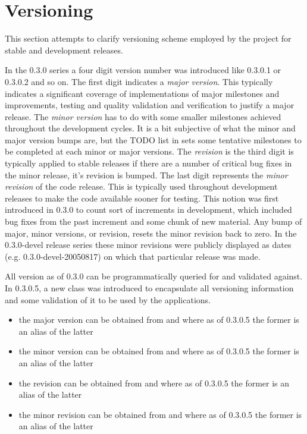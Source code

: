 \section{Versioning}

This section attempts to clarify versioning scheme employed
by the {\marf} project for stable and development releases.

In the 0.3.0 series a four digit version number was introduced
like 0.3.0.1 or 0.3.0.2 and so on. The first digit indicates
a {\em major version}. This typically indicates a significant
coverage of implementations of major milestones and improvements,
testing and quality validation and verification to justify a major
release. The {\em minor version} has to do with some smaller
milestones achieved throughout the development cycles.
It is a bit subjective of what the minor and major version bumps are, but
the TODO list in  sets some tentative milestones
to be completed at each minor or major versions. The {\em revision}
is the third digit is typically applied to stable releases if there
are a number of critical bug fixes in the minor release, it's revision
is bumped. The last digit represents the {\em minor revision} of the
code release. This is typically used throughout development releases
to make the code available sooner for testing. This notion was first
introduced in 0.3.0 to count sort of increments in {\marf} development,
which included bug fixes from the past increment and some chunk of new
material. Any bump of major, minor versions, or revision, resets the
minor revision back to zero. In the 0.3.0-devel release series these
minor revisions were publicly displayed as dates (e.g. 0.3.0-devel-20050817)
on which that particular release was made.

All version as of 0.3.0 can be programmatically queried for
and validated against. In 0.3.0.5, a new  class
was introduced to encapsulate all versioning information and
some validation of it to be used by the applications.

\begin{itemize}
\item
	the major version can be obtained from 
	and  where as of 0.3.0.5 the former
	is an alias of the latter

\item
	the minor version can be obtained from 
	and  where as of 0.3.0.5 the former
	is an alias of the latter

\item
	the revision can be obtained from 
	and  where as of 0.3.0.5 the former
	is an alias of the latter

\item
	the minor revision can be obtained from 
	and  where as of 0.3.0.5 the former
	is an alias of the latter
\end{itemize}

